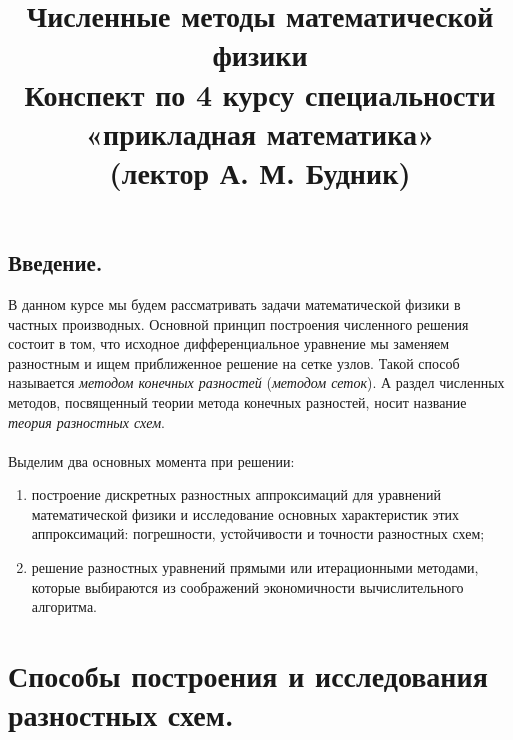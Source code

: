 \documentclass[a4paper, 12pt]{report}
\title{\textbf{\Huge{Численные методы математической физики}}\\Конспект по 4 курсу 
специальности «прикладная математика»\\(лектор А. М. Будник)}
\date{}
\numberwithin{equation}{section}
\begin{document}
\maketitle
\tableofcontents{}
\newpage
\section*{Введение.}
В данном курсе мы будем рассматривать задачи математической физики в частных производных. Основной принцип построения численного решения состоит в том, что исходное дифференциальное уравнение мы заменяем разностным и ищем приближенное решение на сетке узлов. Такой способ называется \textit{методом конечных разностей} (\textit{методом сеток}). А раздел численных методов, посвященный теории метода конечных разностей, носит название \textit{теория разностных схем}. 
\\\\
Выделим два основных момента при решении:
\begin{enumerate}
\item построение дискретных разностных аппроксимаций для уравнений математической физики и исследование основных характеристик этих аппроксимаций: погрешности, устойчивости и точности разностных схем;
\item решение разностных уравнений прямыми или итерационными методами, которые выбираются из соображений экономичности вычислительного алгоритма.
\end{enumerate}
\chapter{Способы построения и исследования разностных схем.}
\end{document}
